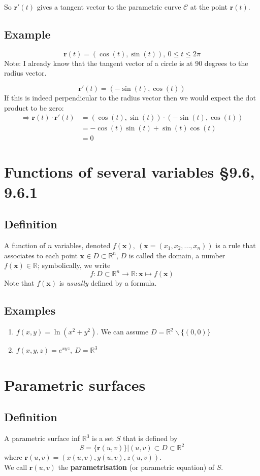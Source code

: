 \documentclass[11pt]{article}
\newcommand{\reals}{\mathbb{R}}
\renewcommand{\vec}[1]{\mathbf{#1}}
\begin{document}
So $\vec{r}'(t)$ gives a tangent vector to the parametric curve $\mathcal{C}$ at the point $\vec{r}(t)$.

\subsection{Example}
\[ \vec{r}(t) = (\cos(t), \sin(t)),\ 0 \leq t \leq 2\pi \]
Note: I already know that the tangent vector of a circle is at 90 degrees to the radius vector.

\[ \vec{r}'(t) = (-\sin(t), \cos(t)) \]
If this is indeed perpendicular to the radius vector then we would expect the dot product to be zero:
\begin{align*}
\Rightarrow \vec{r}(t) \cdot \vec{r}'(t) &= (\cos(t), \sin(t)) \cdot (-\sin(t), \cos(t)) \\
&= -\cos(t) \sin(t) + \sin(t) \cos(t) \\
&= 0
\end{align*} 

\section{Functions of several variables §9.6, 9.6.1}
\subsection{Definition}
A function of $n$ variables, denoted $f(\vec{x}),\ (\vec{x} = (x_1, x_2, ..., x_n))$ is a rule that associates to each point $\vec{x} \in D \subset \reals^n$, $D$ is called the domain, a number $f(\vec{x}) \in \reals$; symbolically, we write
\[ f: D \subset \reals^n \rightarrow \reals : \vec{x} \mapsto f(\vec{x}) \]
Note that $f(\vec{x})$ is \textit{usually} defined by a formula.

\subsection{Examples}
\begin{enumerate}[ (a) ]
\item $f(x, y) = \ln(x^2 + y^2)$. We can assume $D = \reals^2 \backslash \{(0, 0) \}$
\item $f(x, y, z) = e^{xyz},\ D = \reals^3$
\end{enumerate}

\section{Parametric surfaces}
\subsection{Definition}
A parametric surface inf $\reals^3$ is a set $S$ that is defined by
\[ S = \{ \vec{r}(u,v) \} | (u, v) \subset D \subset \reals^2 \]
where $\vec{r}(u, v) = (x(u,v), y(u, v), z(u, v))$.\\
We call $\vec{r}(u, v)$ the \textbf{parametrisation} (or parametric equation) of $S$.
\end{document}
